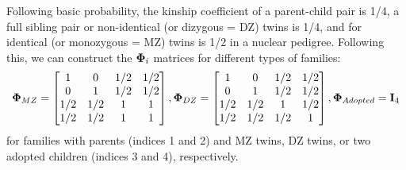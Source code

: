 Following basic probability, the kinship coefficient of a parent-child pair is 1/4, a full sibling pair or non-identical (or dizygous = DZ) twins is 1/4, and for identical (or monozygous = MZ) twins is 1/2 in a nuclear pedigree. Following this, we can construct the ${\boldsymbol{\Phi}}_i$ matrices for different types of families:
%
\begin{align*}
\bfPhi_{MZ} = \begin{bmatrix}
1 & 0 & 1/2 & 1/2 \\
0 & 1 & 1/2 & 1/2 \\
1/2 & 1/2 & 1 & 1\\
1/2 & 1/2 & 1 & 1
\end{bmatrix},
\bfPhi_{DZ} = \begin{bmatrix}
1 & 0 & 1/2 & 1/2 \\
0 & 1 & 1/2 & 1/2 \\
1/2 & 1/2 & 1 & 1/2\\
1/2 & 1/2 & 1/2 & 1
\end{bmatrix},
\bfPhi_{Adopted} = \bfI_4
\end{align*}
%
for families with parents (indices 1 and 2) and MZ twins, DZ twins, or two adopted children (indices 3 and 4), respectively.
